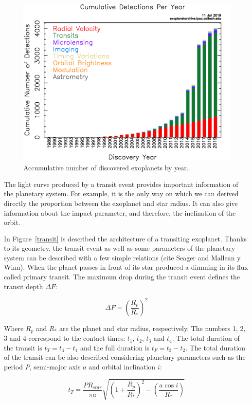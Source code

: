 \begin{figure}[H]
\centering
\includegraphics[width=0.7\columnwidth]{imagenes/exo_dischist_cumulative.png}
\caption{Accumulative number of discovered exoplanets by year.}
\label{amount_exoplanet}
\end{figure}

The light curve produced by a transit event provides important information of the planetary system. For example, it is the only way on which we can derived directly the proportion between the exoplanet and star radius. It can also give information about the impact parameter, and therefore, the inclination of the orbit. 

In Figure~\ref{transit} is described the architecture of a transiting exoplanet. Thanks to its geometry, the transit event as well as some parameters of the planetary system can be described with a few simple relations (cite Seager and Mallean y Winn).  When the planet passes in front of its star produced a dimming in its flux called primary transit. The maximum drop during the transit event defines the transit depth $\Delta{F}$:

\begin{equation}
    \Delta{F} = \left(\frac{R_{p}}{R_{*}}\right)^2 
\end{equation}

Where $R_{p}$ and $R_{*}$ are the planet and star radius, respectively. The numbers 1, 2, 3 and 4 correspond to the contact times: $t_{1}$, $t_{2}$, $t_{3}$ and $t_{4}$. The total duration of the transit is $t_{T} = t_{4}-t_{1}$ and the full duration is $t_{F}=t_{3}-t_{2}$. The total duration of the transit can be also described considering planetary parameters such as the period $P$, semi-major axis $a$ and orbital inclination $i$:

\begin{equation}
    t_{T} = \frac{PR_{star}}{\pi a} \sqrt{\left(1+\frac{R_{p}}{R_{*}}\right)^2-\left(\frac{a\cos i}{R_{*}}\right)}
\end{equation}

